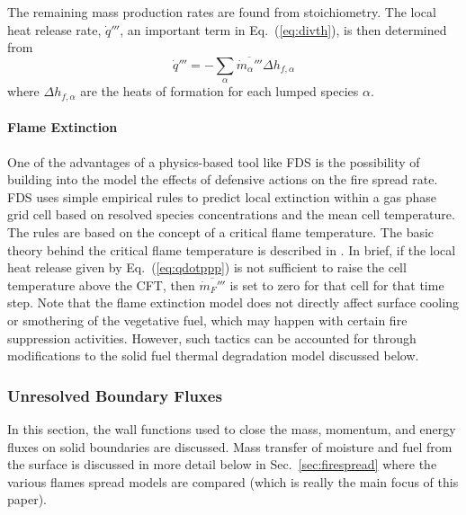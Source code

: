 \documentclass[journal,article,atmosphere,submit,moreauthors,pdftex]{Definitions/mdpi}
\begin{document}
The remaining mass production rates are found from stoichiometry.  The local heat release rate, $\dot{q}'''$, an important term in Eq.~(\ref{eq:divth}), is then determined from
\begin{equation}
\label{eq:qdotppp}
\dot{q}''' = - \sum_\alpha \overline{\dot{m}_\alpha'''} \Delta h_{f,\alpha}
\end{equation}
where $\Delta h_{f,\alpha}$ are the heats of formation for each lumped species $\alpha$.

\paragraph{Flame Extinction} One of the advantages of a physics-based tool like FDS is the possibility of building into the model the effects of defensive actions on the fire spread rate.  FDS uses simple empirical rules to predict local extinction within a gas phase grid cell based on resolved species concentrations and the mean cell temperature. The rules are based on the concept of a critical flame temperature. The basic theory behind the critical flame temperature is described in \cite{SFPE:Beyler}.  In brief, if the local heat release given by Eq.~(\ref{eq:qdotppp}) is not sufficient to raise the cell temperature above the CFT, then $\overline{\dot{m}_{F}'''}$ is set to zero for that cell for that time step.  Note that the flame extinction model does not directly affect surface cooling or smothering of the vegetative fuel, which may happen with certain fire suppression activities.  However, such tactics can be accounted for through modifications to the solid fuel thermal degradation model discussed below.

\subsubsection{Unresolved Boundary Fluxes}
\label{sec:boundflx}
In this section, the wall functions used to close the mass, momentum, and energy fluxes on solid boundaries are discussed.  Mass transfer of moisture and fuel from the surface is discussed in more detail below in Sec.~\ref{sec:firespread} where the various flames spread models are compared (which is really the main focus of this paper).
\end{document}
